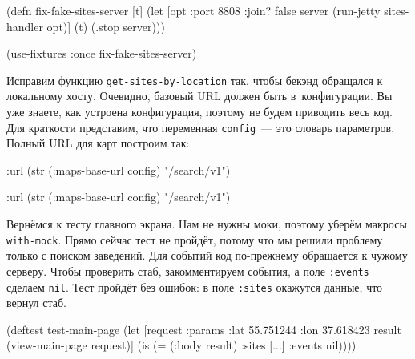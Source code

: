 \else

\begin{english}
  \begin{clojure}
(defn fix-fake-sites-server [t]
  (let [opt {:port 8808 :join? false}
        server (run-jetty sites-handler opt)]
    (t)
    (.stop server)))

(use-fixtures :once fix-fake-sites-server)
  \end{clojure}
\end{english}

\fi


Исправим функцию \verb|get-sites-by-location| так, чтобы бекэнд обращался к
локальному хосту. Очевидно, базовый URL должен быть в~конфигурации. Вы уже
знаете, как устроена конфигурация, поэтому не будем приводить весь код. Для
краткости представим, что переменная \verb|config|~--- это словарь
параметров. Полный URL для карт построим так:

\ifx\devicetype\mobile

\begin{english}
  \begin{clojure}
{:url (str (:maps-base-url config)
        "/search/v1")}
  \end{clojure}
\end{english}

\else

\begin{english}
  \begin{clojure}
{:url (str (:maps-base-url config) "/search/v1")}
  \end{clojure}
\end{english}

\fi

Вернёмся к тесту главного экрана. Нам не нужны моки, поэтому уберём макросы
\verb|with-mock|. Прямо сейчас тест не пройдёт, потому что мы решили проблему
только с поиском заведений. Для событий код по-прежнему обращается к чужому
серверу. Чтобы проверить стаб, закомментируем события, а поле \verb|:events|
сделаем \verb|nil|. Тест пройдёт без ошибок: в поле \verb|:sites| окажутся
данные, что вернул стаб.

\ifx\devicetype\mobile

\begin{english}
  \begin{clojure}
(deftest test-main-page
  (let [request
        {:params {:lat 55.751244
                  :lon 37.618423}}
        result (view-main-page request)]
    (is (= (:body result)
           {:sites [...] :events nil}))))
  \end{clojure}
\end{english}

